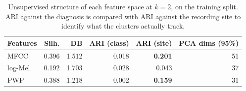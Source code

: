 \begin{table}[t]
\centering
\caption{Unsupervised structure of each feature space at $k=2$, on the training
split. ARI against the diagnosis is compared with ARI against the recording site
to identify what the clusters actually track.}
\label{tab:clustering}
\begin{tabular}{lrrrrr}
\toprule
Features & Silh. & DB & ARI (class) & ARI (site) & PCA dims (95\%) \\
\midrule
MFCC    & 0.396 & 1.512 & 0.018 & \textbf{0.201} & 51 \\
log-Mel & 0.192 & 1.703 & 0.028 & 0.043 & 37 \\
PWP     & 0.388 & 1.218 & 0.002 & \textbf{0.159} & 31 \\
\bottomrule
\end{tabular}
\end{table}
